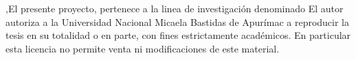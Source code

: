 \newpage
\pagestyle{plain}
\vspace*{\fill}
 
\doclicenseThis ,El presente proyecto, pertenece a la linea de investigación denominado
El autor autoriza a la Universidad Nacional Micaela Bastidas de Apurímac a reproducir la tesis en su totalidad o en parte, con fines estrictamente académicos.
En particular esta licencia no permite venta ni modificaciones de este material.
	



